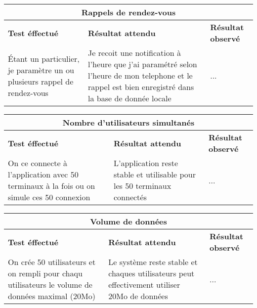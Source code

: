 \documentclass{article}
\begin{document}
  \begin{center}
    \begin{tabular}{|p{5cm}|p{5cm}|p{5cm}|}
      \hline
      \multicolumn{3}{|c|}{\textbf{Rappels de rendez-vous}} \\
      \hline
      \textbf{Test éffectué} & \textbf{Résultat attendu} & \textbf{Résultat observé} \\
      \hline

      Étant un particulier, je paramètre un ou plusieurs rappel de rendez-vous&
      Je recoit une notification à l'heure que j'ai paramétré selon l'heure de mon telephone
      et le rappel est bien enregistré dans la base de donnée locale&
      ... \\


      \hline

    \end{tabular}
  \end{center}

  \begin{center}
    \begin{tabular}{|p{5cm}|p{5cm}|p{5cm}|}
      \hline
      \multicolumn{3}{|c|}{\textbf{Nombre d'utilisateurs simultanés}} \\
      \hline
      \textbf{Test éffectué} & \textbf{Résultat attendu} & \textbf{Résultat observé} \\
      \hline

      On ce connecte à l'application avec 50 terminaux à la fois ou on simule ces 50 connexion&
      L'application reste stable et utilisable pour les 50 terminaux connectés&
      ... \\


      \hline

    \end{tabular}
  \end{center}

  \begin{center}
    \begin{tabular}{|p{5cm}|p{5cm}|p{5cm}|}
      \hline
      \multicolumn{3}{|c|}{\textbf{Volume de données}} \\
      \hline
      \textbf{Test éffectué} & \textbf{Résultat attendu} & \textbf{Résultat observé} \\
      \hline

      On crée 50 utilisateurs et on rempli pour chaqu utilisateurs le volume de données maximal (20Mo)&
      Le système reste stable et chaques utilisateurs peut effectivement utiliser 20Mo de données&
      ... \\


      \hline

    \end{tabular}
  \end{center}
\end{document}
